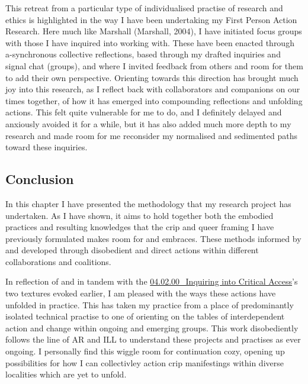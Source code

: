 This retreat from a particular type of individualised practise of
research and ethics is highlighted in the way I have been undertaking my
First Person Action Research. Here much like Marshall (Marshall, 2004),
I have initiated focus groups with those I have inquired into working
with. These have been enacted through a-synchronous collective
reflections, based through my drafted inquiries and signal chat
(groups), and where I invited feedback from others and room for them to
add their own perspective. Orienting towards this direction has brought
much joy into this research, as I reflect back with collaborators and
companions on our times together, of how it has emerged into compounding
reflections and unfolding actions. This felt quite vulnerable for me to
do, and I definitely delayed and anxiously avoided it for a while, but
it has also added much more depth to my research and made room for me
reconsider my normalised and sedimented paths toward these inquiries.

\hypertarget{conclusion}{%
\subsection{Conclusion}\label{conclusion}}

In this chapter I have presented the methodology that my research
project has undertaken. As I have shown, it aims to hold together both
the embodied practices and resulting knowledges that the crip and queer
framing I have previously formulated makes room for and embraces. These
methods informed by and developed through disobedient and direct actions
within different collaborations and coalitions.

In reflection of and in tandem with the
\href{../../04_Configure-able_Methods/sections/04.02.00_Inquiring\%20into\%20Critical\%20Access.md}{04.02.00\_Inquiring
into Critical Access}'s two textures evoked earlier, I am pleased with
the ways these actions have unfolded in practice. This has taken my
practice from a place of predominantly isolated technical practise to
one of orienting on the tables of interdependent action and change
within ongoing and emerging groups. This work disobediently follows the
line of AR and ILL to understand these projects and practises as ever
ongoing. I personally find this wiggle room for continuation cozy,
opening up possibilities for how I can collectivley action crip
manifestings within diverse localities which are yet to unfold.
